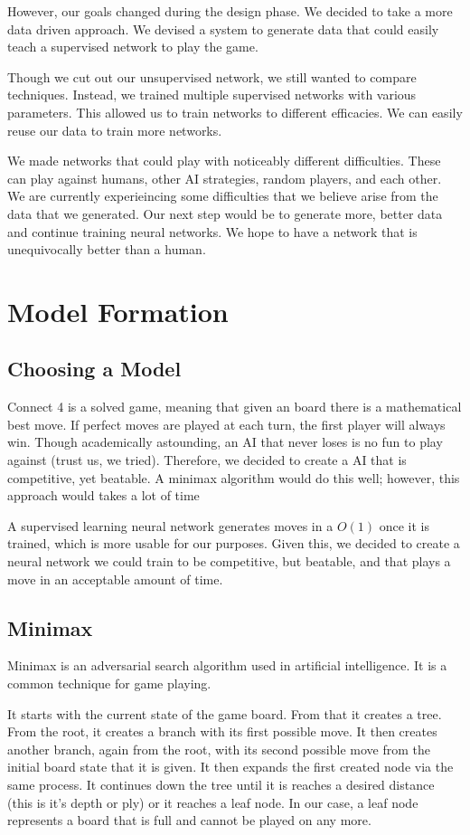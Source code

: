\documentclass[12pt]{article}
\begin{document}
However, our goals changed during the design phase. We decided to take a more data driven approach. We devised a system to generate data that could easily teach a supervised network to play the game.

Though we cut out our unsupervised network, we still wanted to compare techniques. Instead, we trained multiple supervised networks with various parameters. This allowed us to train networks to different efficacies. We can easily reuse our data to train more networks. 

We made networks that could play with noticeably different difficulties. These can play against humans, other AI strategies, random players, and each other. We are currently experieincing some difficulties that we believe arise from the data that we generated. Our next step would be to generate more, better data and continue training neural networks. We hope to have a network that is unequivocally better than a human.

\section{Model Formation}
\subsection{Choosing a Model}
Connect 4 is a solved game, meaning that given an board there is a mathematical best move. If perfect moves are played at each turn, the first player will always win. Though academically astounding, an AI that never loses is no fun to play against (trust us, we tried). Therefore, we decided to create a AI that is competitive, yet beatable. A minimax algorithm would do this well; however, this approach would takes a lot of time


 A supervised learning neural network generates moves in a $O (1)$ once it is trained, which is more usable for our purposes. Given this, we decided to create a neural network we could train to be competitive, but beatable, and that plays a move in an acceptable amount of time.

\subsection{Minimax}
Minimax is an adversarial search algorithm used in artificial intelligence. It is a common technique for game playing. 

It starts with the current state of the game board. From that it creates a tree. From the root, it creates a branch with its first possible move. It then creates another branch, again from the root, with its second possible move from the initial board state that it is given. It then expands the first created node via the same process. It continues down the tree until it is reaches a desired distance (this is it's depth or ply) or it reaches a leaf node. In our case, a leaf node represents a board that is full and cannot be played on any more.
\end{document}

